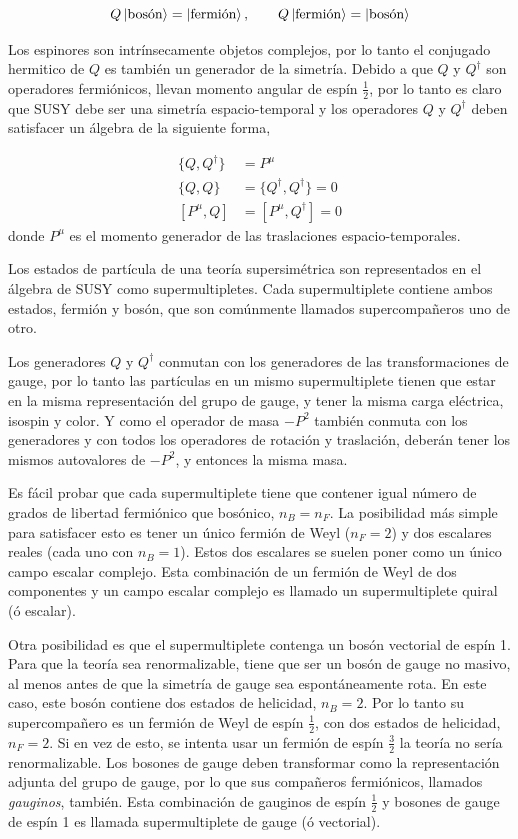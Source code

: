 \begin{equation}
  Q \left| \text{bosón} \right> = \left| \text{fermión} \right>, \quad \quad Q
  \left| \text{fermión} \right> = \left| \text{bosón} \right>
\end{equation}

Los espinores son intrínsecamente objetos complejos, por lo tanto el conjugado
hermitico de $Q$ es también un generador de la simetría. Debido a que $Q$ y
$Q^\dagger$ son operadores fermiónicos, llevan momento angular de espín $\frac{1}{2}$, por
lo tanto es claro que SUSY debe ser una simetría espacio-temporal y los
operadores $Q$ y $Q^\dagger$ deben satisfacer un álgebra de la siguiente forma,

\begin{align}
  \{Q, Q^\dagger\} &= P^\mu \\
  \{Q, Q\} &= \{Q^\dagger, Q^\dagger\} = 0 \\
  [P^\mu, Q] &= [P^\mu, Q^\dagger] = 0
\end{align}
%
donde $P^\mu$ es el momento generador de las traslaciones
espacio-temporales.

Los estados de partícula de una teoría supersimétrica son representados en el
álgebra de SUSY como supermultipletes. Cada supermultiplete contiene
ambos estados, fermión y bosón, que son comúnmente llamados supercompa\~neros
uno de otro.

Los generadores $Q$ y $Q^\dagger$ conmutan con los generadores de las
transformaciones de gauge, por lo tanto las partículas en un mismo
supermultiplete tienen que estar en la misma representación del grupo de gauge,
y tener la misma carga eléctrica, isospin y color. Y como el operador de masa
$-P^2$ también conmuta con los generadores y con todos los operadores de
rotación y traslación, deberán tener los mismos autovalores de $-P^2$, y
entonces la misma masa.

Es fácil probar que cada supermultiplete tiene que contener igual número de
grados de libertad fermiónico que bosónico, $n_B = n_F$. La posibilidad más
simple para satisfacer esto es tener un único fermión de Weyl ($n_F=2$) y dos
escalares reales (cada uno con $n_B=1$). Estos dos escalares se suelen poner
como un único campo escalar complejo. Esta combinación de un fermión de Weyl de
dos componentes y un campo escalar complejo es llamado un supermultiplete
quiral (ó escalar).

Otra posibilidad es que el supermultiplete contenga un bosón vectorial de espín
1. Para que la teoría sea renormalizable, tiene que ser un bosón de gauge no
masivo, al menos antes de que la simetría de gauge sea espontáneamente rota. En
este caso, este bosón contiene dos estados de helicidad, $n_B=2$. Por lo tanto
su supercompa\~nero es un fermión de Weyl de espín $\frac{1}{2}$, con dos estados de
helicidad, $n_F=2$. Si en vez de esto, se intenta usar un fermión de espín $\frac{3}{2}$
la teoría no sería renormalizable. Los bosones de gauge deben transformar como
la representación adjunta del grupo de gauge, por lo que sus compañeros
fermiónicos, llamados \emph{gauginos}, también. Esta combinación de gauginos
de espín $\frac{1}{2}$ y bosones de gauge de espín 1 es llamada supermultiplete de
gauge (ó vectorial).

